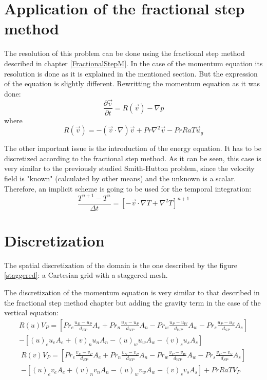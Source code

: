\section{Application of the fractional step method}
The resolution of this problem can be done using the fractional step method described in chapter \ref{FractionalStepM}. In the case of the momentum equation its resolution is done as it is explained in the mentioned section. But the expression of the equation is slightly different. Rewritting the momentum equation as it was done:
\begin{equation}
\frac{\partial\vec{v}}{\partial t}=R\left(\vec{v}\right)-\nabla p
\end{equation}
where
\begin{equation}
R\left(\vec{v}\right)=-\left(\vec{v}\cdot\nabla\right)\vec{v}+Pr\nabla^{2}\vec{v}-PrRaT\vec{u}_{g}
\end{equation}

The other important issue is the introduction of the energy equation. It has to be discretized according to the fractional step method. As it can be seen, this case is very similar to the previously studied Smith-Hutton problem, since the velocity field is "known" (calculated by other means) and the unknown is a scalar. Therefore, an implicit scheme is going to be used for the temporal integration:
\begin{equation}
\frac{T^{n+1}-T^{n}}{\Delta t}=\left[-\vec{v}\cdot\nabla T+\nabla^{2}T\right]^{n+1}
\end{equation}

\section{Discretization}
The spatial discretization of the domain is the one described by the figure \ref{staggered}: a Cartesian grid with a staggered mesh.

The discretization of the momentum equation is very similar to that described in the fractional step method chapter but adding the gravity term in the case of the vertical equation:
\begin{multline}
	R\left(u\right)V_{P}=\left[Pr_{e}\frac{u_{E}-u_{P}}{d_{EP}}A_{e}+Pr_{n}\frac{u_{N}-u_{P}}{d_{NP}}A_{n}-Pr_{w}\frac{u_{P}-u_{W}}{d_{WP}}A_{w}-Pr_{s}\frac{u_{P}-u_{S}}{d_{SP}}A_{s}\right] \\
	-\left[\left(u\right)_{e}u_{e}A_{e}+\left(v\right)_{n}u_{n}A_{n}-\left(u\right)_{w}u_{w}A_{w}-\left(v\right)_{s}u_{s}A_{s}\right]
\end{multline}
\begin{multline}
	R\left(v\right)V_{P}=\left[Pr_{e}\frac{v_{E}-v_{P}}{d_{EP}}A_{e}+Pr_{n}\frac{v_{N}-v_{P}}{d_{NP}}A_{n}-Pr_{w}\frac{v_{P}-v_{W}}{d_{WP}}A_{w}-Pr_{s}\frac{v_{P}-v_{S}}{d_{SP}}A_{s}\right] \\
	-\left[\left(u\right)_{e}v_{e}A_{e}+\left(v\right)_{n}v_{n}A_{n}-\left(u\right)_{w}v_{w}A_{w}-\left(v\right)_{s}v_{s}A_{s}\right]+PrRaTV_{P}
\end{multline}

